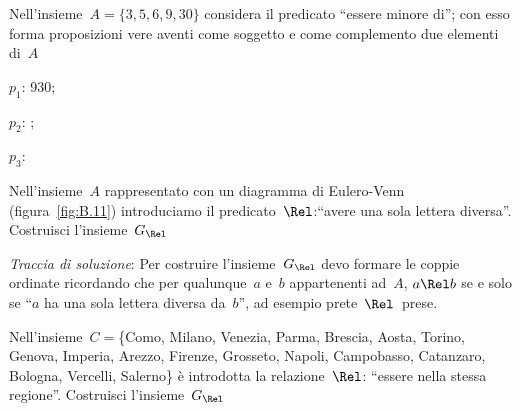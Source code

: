 \subsubsection*{}


\begin{esercizio}
\label{ese:B.2}
Nell'insieme~\(A = \{ 3,5,6,9,30 \}\) considera il predicato ``essere minore 
di''; 
con esso forma proposizioni vere aventi come soggetto e come complemento due 
elementi di~\(A\)
\begin{multicols}{3}
\begin{enumeratea}
\item \(p_1\): 930;
\item \(p_2\): \dotfill;
\item \(p_3\): \dotfill
\end{enumeratea}
\end{multicols}
\end{esercizio}

\begin{multicols}{2}

\begin{esercizio}
\label{ese:B.3}
Nell'insieme~\(A\) rappresentato con un diagramma di Eulero-Venn 
(figura~\ref{fig:B.11}) introduciamo il predicato~\(\Rel\):``avere
una sola lettera diversa''. Costruisci l'insieme~\(G_\Rel\)

\emph{Traccia di soluzione}:
Per costruire l'insieme~\(G_\Rel\) devo formare le coppie ordinate ricordando 
che per qualunque~\(a\) e~\(b\) appartenenti ad~\(A\), \(a \Rel b\)
se e solo se ``\(a\) ha una sola lettera diversa da~\(b\)'', ad esempio 
prete~\( \Rel\)~prese.

\begin{center}
\begin{inaccessibleblock}
 
\end{inaccessibleblock}
\end{center}

\end{esercizio}

\end{multicols}

\begin{esercizio}
\label{ese:B.4}
Nell'insieme~\(C = \)\{Como, Milano, Venezia, Parma, Brescia, Aosta, Torino, 
Genova, Imperia, Arezzo, Firenze, Grosseto, Napoli, Campobasso, Catanzaro, 
Bologna, Vercelli, Salerno\} è introdotta la relazione~\(\Rel\): 
``essere nella stessa regione''. Costruisci l'insieme~\(G_\Rel\)
\end{esercizio}

